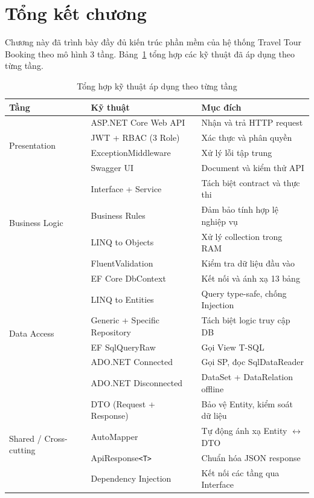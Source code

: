 \section{Tổng kết chương}\label{Sec3.8}

Chương này đã trình bày đầy đủ kiến trúc phần mềm của hệ
thống Travel Tour Booking theo mô hình 3 tầng. Bảng~\ref{table:summary}
tổng hợp các kỹ thuật đã áp dụng theo từng tầng.

\begin{table}[H]
  \begin{center}
    \begin{tabular}{|l|l|l|}
      \hline
      \textbf{Tầng} & \textbf{Kỹ thuật} & \textbf{Mục đích} \\
      \hline
      \multirow{4}{*}{Presentation}
        & ASP.NET Core Web API
          & Nhận và trả HTTP request \\
        & JWT + RBAC (3 Role)
          & Xác thực và phân quyền \\
        & ExceptionMiddleware
          & Xử lý lỗi tập trung \\
        & Swagger UI
          & Document và kiểm thử API \\
      \hline
      \multirow{4}{*}{Business Logic}
        & Interface + Service
          & Tách biệt contract và thực thi \\
        & Business Rules
          & Đảm bảo tính hợp lệ nghiệp vụ \\
        & LINQ to Objects
          & Xử lý collection trong RAM \\
        & FluentValidation
          & Kiểm tra dữ liệu đầu vào \\
      \hline
      \multirow{6}{*}{Data Access}
        & EF Core DbContext
          & Kết nối và ánh xạ 13 bảng \\
        & LINQ to Entities
          & Query type-safe, chống Injection \\
        & Generic + Specific Repository
          & Tách biệt logic truy cập DB \\
        & EF SqlQueryRaw
          & Gọi View T-SQL \\
        & ADO.NET Connected
          & Gọi SP, đọc SqlDataReader \\
        & ADO.NET Disconnected
          & DataSet + DataRelation offline \\
      \hline
      \multirow{4}{*}{Shared / Cross-cutting}
        & DTO (Request + Response)
          & Bảo vệ Entity, kiểm soát dữ liệu \\
        & AutoMapper
          & Tự động ánh xạ Entity $\leftrightarrow$ DTO \\
        & ApiResponse\texttt{<T>}
          & Chuẩn hóa JSON response \\
        & Dependency Injection
          & Kết nối các tầng qua Interface \\
      \hline
    \end{tabular}
  \end{center}
  \caption{Tổng hợp kỹ thuật áp dụng theo từng tầng}
  \label{table:summary}
\end{table}

